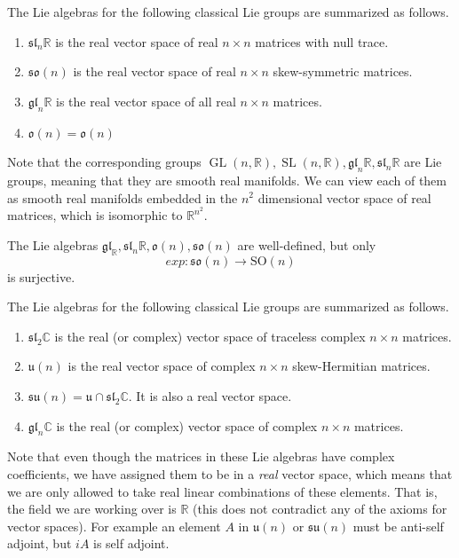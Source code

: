 \documentclass{article}
\DeclareMathOperator{\GL}{GL}
\DeclareMathOperator{\SL}{SL}
\begin{document}
      \begin{theorem}
      The Lie algebras for the following classical Lie groups are summarized as follows. 
      \begin{enumerate}
          \item $\mathfrak{sl}_n \mathbb{R}$ is the real vector space of real $n \times n$ matrices with null trace.
          \item $\mathfrak{so}(n)$ is the real vector space of real $n \times n$ skew-symmetric matrices. 
          \item $\mathfrak{gl}_n \mathbb{R}$ is the real vector space of all real $n \times n$ matrices.
          \item $\mathfrak{o}(n) = \mathfrak{o}(n)$
      \end{enumerate}
      \end{theorem}
      Note that the corresponding groups $\GL(n, \mathbb{R}), \SL(n, \mathbb{R}), \mathfrak{gl}_n \mathbb{R}, \mathfrak{sl}_n \mathbb{R}$ are Lie groups, meaning that they are smooth real manifolds. We can view each of them as smooth real manifolds embedded in the $n^2$ dimensional vector space of real matrices, which is isomorphic to $\mathbb{R}^{n^2}$. 

      \begin{theorem}
      The Lie algebras $\mathfrak{gl}_ \mathbb{R}, \mathfrak{sl}_n \mathbb{R}, \mathfrak{o}(n), \mathfrak{so}(n)$ are well-defined, but only 
      \[exp: \mathfrak{so}(n) \longrightarrow \text{SO}(n)\]
      is surjective. 
      \end{theorem}

      \begin{theorem}
      The Lie algebras for the following classical Lie groups are summarized as follows. 
      \begin{enumerate}
          \item $\mathfrak{sl}_2 \mathbb{C}$ is the real (or complex) vector space of traceless complex $n \times n$ matrices. 
          \item $\mathfrak{u}(n)$ is the real vector space of complex $n \times n$ skew-Hermitian matrices. 
          \item $\mathfrak{su}(n) = \mathfrak{u} \cap \mathfrak{sl}_2 \mathbb{C}$. It is also a real vector space. 
          \item $\mathfrak{gl}_n \mathbb{C}$ is the real (or complex) vector space of complex $n \times n$ matrices. 
      \end{enumerate}
      Note that even though the matrices in these Lie algebras have complex coefficients, we have assigned them to be in a \textit{real} vector space, which means that we are only allowed to take real linear combinations of these elements. That is, the field we are working over is $\mathbb{R}$ (this does not contradict any of the axioms for vector spaces). For example an element $A$ in $\mathfrak{u}(n)$ or $\mathfrak{su}(n)$ must be anti-self adjoint, but $iA$ is self adjoint. 
      \end{theorem}
\end{document}
